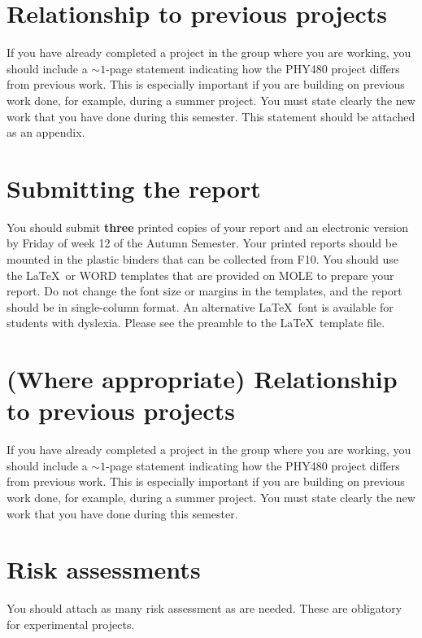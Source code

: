 \documentclass[a4paper,11pt]{article}
\begin{document}
\section{Relationship to previous projects}
If you have already completed a project in the group where you are working, you should include a $\sim 1$-page statement indicating how the PHY480 project differs from previous work. This is especially important if you are building on previous work done, for example, during a summer project. You must state clearly the new work that you have done during this semester. This statement should be attached as an appendix.

\section{Submitting the report}

You should submit \textbf{three} printed copies of your report and an electronic version by Friday of week 12 of the Autumn Semester. Your printed reports should be mounted in the plastic binders that can be collected from F10. You should use the \LaTeX\ or WORD templates that are provided on MOLE to prepare your report. Do not change the font size or margins in the templates, and the report should be in single-column format. An alternative \LaTeX\  font is available for students with dyslexia. Please see the preamble to the \LaTeX\  template file.





\newpage






\newpage 
\begin{appendix}

\section{(Where appropriate) Relationship to previous projects}
If you have already completed a project in the group where you are working, you should include a $\sim 1$-page statement indicating how the PHY480 project differs from previous work. This is especially important if you are building on previous work done, for example, during a summer project. You must state clearly the new work that you have done during this semester.
\newpage

\section{Risk assessments}
You should attach as many risk assessment as are needed. These are obligatory for experimental projects.

\end{appendix}
\end{document}
